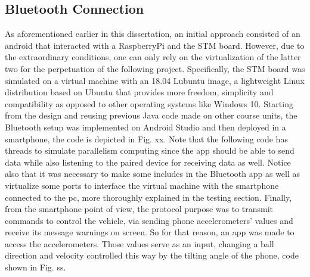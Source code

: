 \subsection{Bluetooth Connection}%
\label{sec:bluetooth-connection}
As aforementioned earlier in this dissertation, an initial approach consisted of an android that interacted with a RaspberryPi and the STM board.
%
However, due to the extraordinary conditions, one can only rely on the virtualization of the latter two for the perpetuation of the following project.
Specifically, the STM board was simulated on a virtual machine with an 18.04 Lubuntu image, a lightweight Linux distribution based on Ubuntu that provides more freedom, simplicity and compatibility as opposed to other operating systems like Windows 10.
%
Starting from the design and reusing previous Java code made on other course units, the Bluetooth setup was implemented on Android Studio and then deployed in a smartphone, the code is depicted in Fig. xx.
%
Note that the following code has threads to simulate parallelism computing since the app should be able to send data while also listening to the paired device for receiving data as well.
%
Notice also that it was necessary to make some includes in the Bluetooth app as well as virtualize some ports to interface the virtual machine with the smartphone connected to the pc, more thoroughly explained in the testing section.
%
Finally, from the smartphone point of view, the protocol purpose was to transmit commands to control the vehicle, via sending phone accelerometers' values and receive its message warnings on screen. 
%
So for that reason, an app was made to access the accelerometers. Those values serve as an input, changing a ball direction and velocity controlled this way by the tilting angle of the phone, code shown in Fig. ss.


